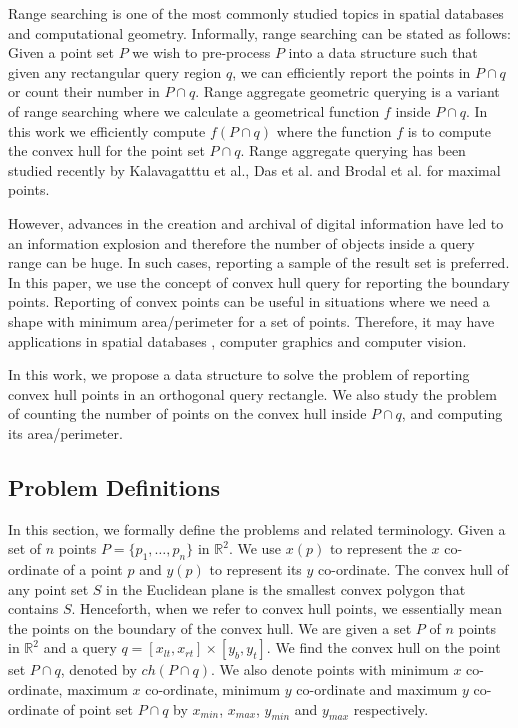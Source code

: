 \documentclass[runningheads,a4paper]{llncs}
\begin{document}
\noindent Range searching is one of the most commonly studied topics in
spatial databases and computational geometry.  Informally, range searching can
be stated as follows: Given a point set $P$ we wish to pre-process $P$ into a
data structure such that given any rectangular query region $q$, we can
efficiently report the points in $P \cap q$ or count their number in $P \cap
q$. Range aggregate geometric querying is a variant of range searching where
we calculate a geometrical function $f$ inside $P\cap q$. In this work we
efficiently compute $f(P\cap q)$ where the function $f$ is to compute the
convex hull for the point set $P\cap q$. Range aggregate querying has been
studied recently by Kalavagatttu et al.\cite{Anil}, Das et al. \cite{asdas}
and Brodal et al. \cite{brodal} for maximal points.


However, advances in the creation and archival of digital information have led
to an information explosion and therefore the number of objects inside a query
range can be huge. In such cases, reporting a sample of the result set is
preferred. In this paper, we use the concept of convex hull query for
reporting the boundary points. Reporting of convex points can be useful in
situations where we need a shape with minimum area/perimeter for a set of
points. Therefore, it may have applications in spatial databases \cite{Tao}, computer graphics and computer
vision.

In this work, we propose a data structure to solve the problem of reporting
convex hull points in an orthogonal query rectangle.  We also study the
problem of counting the number of points on the convex hull inside $P \cap q$,
and computing its area/perimeter.
\subsection{Problem Definitions}
\label{def}
In this section, we formally define the problems and related terminology.
Given a set of $n$ points $P = \{ p_{1},\ldots,p_{n} \} $ in
$\mathbb{R}^{2}$. We use $x(p)$ to represent the $x$ co-ordinate of a point
$p$ and $y(p)$ to represent its $y$ co-ordinate.
The convex hull of any point set $S$ 
in the Euclidean plane is the smallest convex polygon that contains $S$.
Henceforth, when we refer to convex hull points,
we essentially mean the points on the boundary of the convex hull.
We are given a set $P$ of $n$ points in $\mathbb{R}^{2}$ and a query $q = [x_{lt},x_{rt}]\times{}[y_b, y_t]$.
We find the convex hull on the point set $P \cap q$, denoted by $ch(P \cap q)$. We also denote points with minimum $x$
co-ordinate, maximum $x$ co-ordinate, minimum $y$ co-ordinate and maximum $y$ co-ordinate of point set $P \cap q$
by $x_{min}$, $x_{max}$, $y_{min}$ and $y_{max}$ respectively. 
\end{document}
